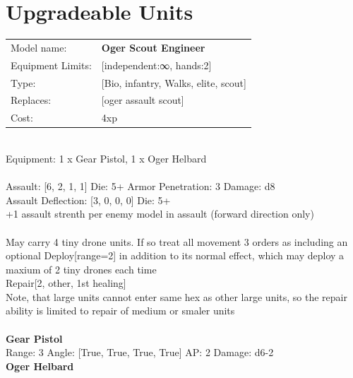 \section{Upgradeable Units}\noindent
\begin{tabular}{ll}
Model name: &{\bf Oger Scout Engineer } \\
Equipment Limits: &[independent:∞, hands:2] \\
Type: &[Bio, infantry, Walks, elite, scout] \\
Replaces: &[oger assault scout] \\
Cost: & 4xp\\
\end{tabular}
\ \\
Equipment: 1 x Gear Pistol, 1 x Oger Helbard \\
\ \\
Assault: [6, 2, 1, 1] Die: 5+ Armor Penetration: 3 Damage: d8 \\
Assault Deflection: [3, 0, 0, 0] Die: 5+\\
\indent +1 assault strenth per enemy model in assault (forward direction only)\\ 
 
\ \\
May carry 4 tiny drone units. If so treat all movement 3 orders as including an optional Deploy[range=2] in addition to its normal effect, which may deploy a maxium of 2 tiny drones each time\\ 
Repair[2, other, 1st healing]\\ 
Note, that large units cannot enter same hex as other large units, so the repair ability is limited to repair of medium or smaler units\\ 

\ \\
{\bf Gear Pistol } \\



Range: 3  Angle: [True, True, True, True] AP: 2 Damage: d6-2 \\




{\bf Oger Helbard } \\






 
\ \\

